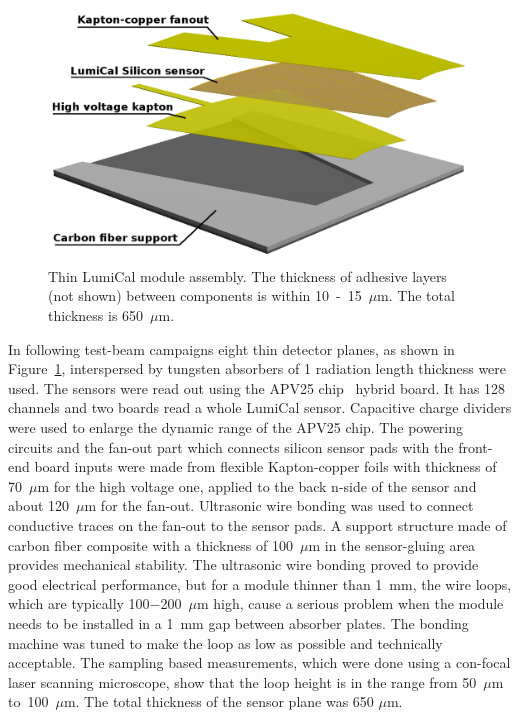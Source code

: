 \begin{figure}[h!]
    \includegraphics[width=0.99\columnwidth]{Calorimeter/FCAL/figs/lc_assembly_1.png}
    \caption{Thin LumiCal module assembly. The thickness of adhesive layers (not shown) between components is within 10~-~15~$\mu$m. The total thickness is 650~$\mu$m.}
    \label{fig_ThinLCAssembly}
\end{figure}

In following test-beam campaigns eight thin detector planes, as shown in  Figure~\ref{fig_ThinLCAssembly}, 
interspersed by tungsten absorbers of 1 radiation length
thickness were used. The sensors were read out using 
the APV25 chip~\cite{949881,French2001359} hybrid board. It has 128 channels and two boards read a whole LumiCal sensor. 
Capacitive 
charge dividers were used to enlarge the dynamic range of the APV25 chip.  
The powering circuits and the fan-out part which connects silicon sensor pads with the front-end
board inputs were made from flexible Kapton-copper foils with thickness of 70~$\mu$m for the high voltage one,
applied to the back n-side of the sensor and about 120~$\mu$m for the fan-out.
Ultrasonic wire bonding was used to connect conductive traces on the fan-out to the sensor pads.
A support structure made of carbon fiber composite with a thickness of 100~$\mu$m in the sensor-gluing area
provides mechanical stability. 
The ultrasonic wire bonding proved to provide good electrical performance, but for a module thinner than 1~mm, the wire loops,
which are typically 100$-$200~$\mu$m high, cause a serious problem when the module needs to be installed in a 1~mm gap between absorber plates.
The bonding machine was tuned to make the loop as low as possible and technically acceptable.
The sampling based measurements, which were done using a con-focal laser scanning microscope, show that the loop
height is in the range from 50~$\mu$m to~100~$\mu$m. The total thickness of the sensor plane was 650 $\mu$m.

